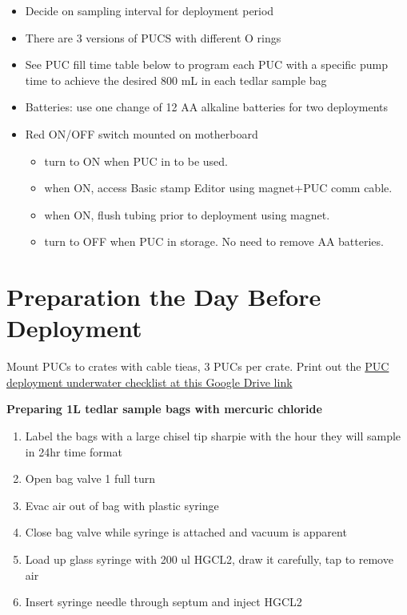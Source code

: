 \documentclass[]{book}
\providecommand{\tightlist}{%
  \setlength{\itemsep}{0pt}\setlength{\parskip}{0pt}}
\begin{document}
\begin{itemize}
\item
  Decide on sampling interval for deployment period
\item
  There are 3 versions of PUCS with different O rings
\item
  See PUC fill time table below to program each PUC with a specific pump time to achieve the desired 800 mL in each tedlar sample bag
\item
  Batteries: use one change of 12 AA alkaline batteries for two deployments
\item
  Red ON/OFF switch mounted on motherboard

  \begin{itemize}
  \tightlist
  \item
    turn to ON when PUC in to be used.
  \item
    when ON, access Basic stamp Editor using magnet+PUC comm cable.
  \item
    when ON, flush tubing prior to deployment using magnet.
  \item
    turn to OFF when PUC in storage. No need to remove AA batteries.
  \end{itemize}
\end{itemize}

\hypertarget{preparation-the-day-before-deployment}{%
\section{Preparation the Day Before Deployment}\label{preparation-the-day-before-deployment}}

Mount PUCs to crates with cable tieas, 3 PUCs per crate. Print out the \href{https://drive.google.com/drive/folders/1X6fAG4OIDs66Ji5xzYsX8JySqhkSs5k-}{PUC deployment underwater checklist at this Google Drive link}

\textbf{Preparing 1L tedlar sample bags with mercuric chloride}

\begin{enumerate}
\def\labelenumi{\arabic{enumi}.}
\tightlist
\item
  Label the bags with a large chisel tip sharpie with the hour they will sample in 24hr time format
\item
  Open bag valve 1 full turn
\item
  Evac air out of bag with plastic syringe
\item
  Close bag valve while syringe is attached and vacuum is apparent
\item
  Load up glass syringe with 200 ul HGCL2, draw it carefully, tap to remove air
\item
  Insert syringe needle through septum and inject HGCL2
\end{enumerate}
\end{document}
